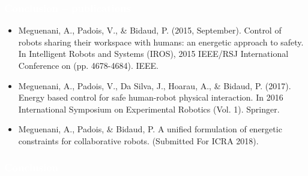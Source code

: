 \begin{frame}
\frametitle{{\textcolor{white}{\hspace{0.3cm}Conclusion -- publications}}}
\begin{itemize}
\item Meguenani, A., Padois, V., \& Bidaud, P. (2015, September). Control of robots sharing their workspace with humans: an energetic approach to safety. In Intelligent Robots and Systems (IROS), 2015 IEEE/RSJ International Conference on (pp. 4678-4684). IEEE.
\item Meguenani, A., Padois, V., Da Silva, J., Hoarau, A., \& Bidaud, P. (2017). Energy based control for safe human-robot physical interaction. In 2016 International Symposium on Experimental Robotics (Vol. 1). Springer.
\item Meguenani, A., Padois, \& Bidaud, P. A unified formulation of energetic constraints for collaborative robots. (Submitted For ICRA 2018).
\end{itemize}
\end{frame}








\begin{frame}
\frametitle{{\textcolor{white}{\hspace{0.3cm}Conclusion}}}
\begin{center}     
{\fontsize{25}{60} }
\end{center}             
\end{frame}





